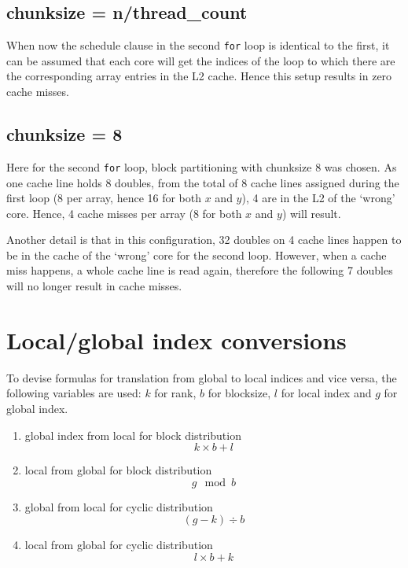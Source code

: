 \documentclass[a4paper,11pt,twoside]{article}
\begin{document}
\subsection*{chunksize = n/thread\_count}
When now the schedule clause in the second \verb+for+ loop is identical to the first, it can be assumed that each core will get the indices of the loop to which there are the corresponding array entries in the L2 cache. Hence this setup results in zero cache misses.
 
\subsection*{chunksize = 8}
Here for the second \verb+for+ loop, block partitioning with chunksize 8 was chosen. As one cache line holds 8 doubles, from the total of 8 cache lines assigned during the first loop (8 per array, hence 16 for both $x$ and $y$), 4 are in the L2 of the `wrong' core. Hence, 4 cache misses per array (8 for both $x$ and $y$) will result. 

Another detail is that in this configuration, 32 doubles on 4 cache lines happen to be in the cache of the `wrong' core for the second loop. However, when a cache miss happens, a whole cache line is read again, therefore the following 7 doubles will no longer result in cache misses.  

\section{Local/global index conversions}
To devise formulas for translation from global to local indices and vice versa, the following variables are used: $k$ for rank, $b$ for blocksize, $l$ for local index and $g$ for global index.

\begin{enumerate}[label={\alph*)}]
\item global index from local for block distribution
\begin{equation*}
k \times b + l
\end{equation*}
\item local from global for block distribution
\begin{equation*}
g \mod b
\end{equation*}
\item global from local for cyclic distribution
\begin{equation*}
(g-k) \div b
\end{equation*}
\item local from global for cyclic distribution
\begin{equation*}
l \times b + k
\end{equation*}
\end{enumerate}
\end{document}
